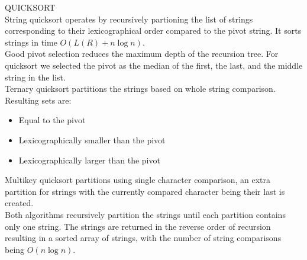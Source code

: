 {\sffamily\normalsize{\color{sciorange} QUICKSORT}}\vspace{1mm}\\
\footnotesize 
String quicksort operates by recursively partioning the list of strings corresponding to their lexicographical order compared to the pivot string. It sorts strings in time $O(L(R) + n \log n)$.\\ 

Good pivot selection reduces the maximum depth of the recursion tree. For quicksort we selected the pivot as the median of the first, the last, and the middle string in the list.\\

Ternary quicksort partitions the strings based on whole string comparison. Resulting sets are:
    
\begin{itemize}
    \item Equal to the pivot
    \item Lexicographically smaller than the pivot
    \item Lexicographically larger than the pivot
\end{itemize}

Multikey quicksort partitions using single character comparison, an extra partition for strings with the currently compared character being their last is created.\\

Both algorithms recursively partition the strings until each partition contains only one string. The strings are returned in the reverse order of recursion resulting in a sorted array of strings, with the number of string comparisons being $O(n \log n)$.




